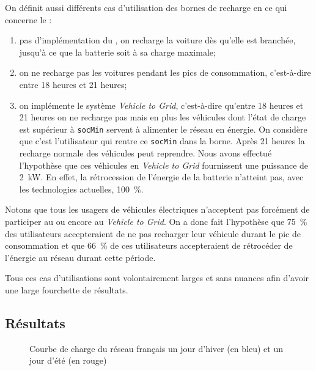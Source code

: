 		On définit aussi différents cas d'utilisation des bornes de recharge en ce qui concerne le \smartgrid{}:
		\begin{enumerate}
			\item pas d'implémentation du \smartgrid{}, on recharge la voiture dès qu'elle est branchée, jusqu'à ce que la batterie soit à sa charge maximale;
			\item on ne recharge pas les voitures pendant les pics de consommation, c'est-à-dire entre 18 heures et 21 heures;
			\item on implémente le système \emph{Vehicle to Grid}, c'est-à-dire qu'entre 18 heures et 21 heures on ne recharge pas mais en plus les véhicules dont l'état de charge est supérieur à \lstinline{socMin} servent à alimenter le réseau en énergie. On considère que c'est l'utilisateur qui rentre ce \lstinline{socMin} dans la borne.  Après 21 heures la recharge normale des véhicules peut reprendre. Nous avons effectué l'hypothèse que ces véhicules en \emph{Vehicle to Grid} fournissent une puissance de \SI{2}{\kilo\watt}. En effet, la rétrocession de l'énergie de la batterie n'atteint pas, avec les technologies actuelles, \SI{100}{\percent}.
		\end{enumerate}
		Notons que tous les usagers de véhicules électriques n'acceptent pas forcément de participer au \smartgrid{} ou encore au \emph{Vehicle to Grid}. On a donc fait l'hypothèse que \SI{75}{\percent} des utilisateurs accepteraient de ne pas recharger leur véhicule durant le pic de consommation et que \SI{66}{\percent} de ces utilisateurs accepteraient de rétrocéder de l'énergie au réseau durant cette période.
		
		\bigskip
		
		Tous ces cas d'utilisations sont volontairement larges et sans nuances afin d'avoir une large fourchette de résultats.
		
		\subsection{Résultats}
			
			\begin{figure}[!h]
				\centering
				\caption{Courbe de charge du réseau français un jour d'hiver (en bleu) et un jour d'été (en rouge)}
			\end{figure}
			
